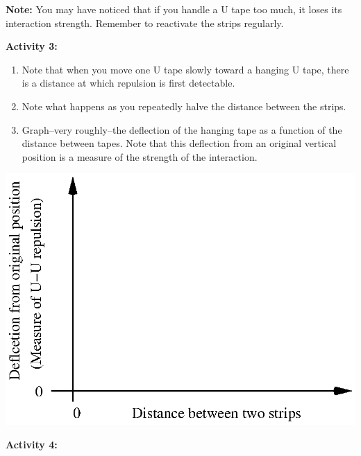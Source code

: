 \vspace{15mm}
\textbf{Note:} You may have noticed that if you handle a U tape too
much, it loses its interaction strength. Remember to reactivate the
strips regularly.

\textbf{Activity 3:}

\begin{enumerate}
\item Note that when you move one U tape slowly toward a hanging U tape,
there is a distance at which repulsion is first detectable.
\item Note what happens as you repeatedly halve the distance between the
strips.\vspace{15mm}

\item Graph--very roughly--the deflection of the hanging tape as a function
of the distance between tapes. Note that this deflection from an original
vertical position is a measure of the strength of the interaction.
\end{enumerate}
\vspace{0.3cm}
{\centering \includegraphics{interactions_of_electric_charges/int_elec_charges_fig_2.eps} \par}
\vspace{0.3cm}

\textbf{Activity 4:}

